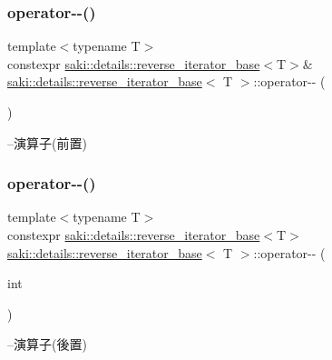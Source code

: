 \subsubsection{\texorpdfstring{operator-\/-\/()}{operator--()}\hspace{0.1cm}{\footnotesize\ttfamily [1/2]}}
{\footnotesize\ttfamily template$<$typename T$>$ \\
constexpr \mbox{\hyperlink{classsaki_1_1details_1_1reverse__iterator__base}{saki\+::details\+::reverse\+\_\+iterator\+\_\+base}}$<$T$>$\& \mbox{\hyperlink{classsaki_1_1details_1_1reverse__iterator__base}{saki\+::details\+::reverse\+\_\+iterator\+\_\+base}}$<$ T $>$\+::operator-\/-\/ (\begin{DoxyParamCaption}{ }\end{DoxyParamCaption})\hspace{0.3cm}{\ttfamily [inline]}}



--演算子(前置) 

\mbox{\label{classsaki_1_1details_1_1reverse__iterator__base_a244654b13c3e164f5382b1216fc5be1f}} 
\subsubsection{\texorpdfstring{operator-\/-\/()}{operator--()}\hspace{0.1cm}{\footnotesize\ttfamily [2/2]}}
{\footnotesize\ttfamily template$<$typename T$>$ \\
constexpr \mbox{\hyperlink{classsaki_1_1details_1_1reverse__iterator__base}{saki\+::details\+::reverse\+\_\+iterator\+\_\+base}}$<$T$>$ \mbox{\hyperlink{classsaki_1_1details_1_1reverse__iterator__base}{saki\+::details\+::reverse\+\_\+iterator\+\_\+base}}$<$ T $>$\+::operator-\/-\/ (\begin{DoxyParamCaption}\item[{int}]{ }\end{DoxyParamCaption})\hspace{0.3cm}{\ttfamily [inline]}}



--演算子(後置) 

\mbox{\label{classsaki_1_1details_1_1reverse__iterator__base_a15f86c8e2c5830b9b3eaf92cee6fb578}} 
